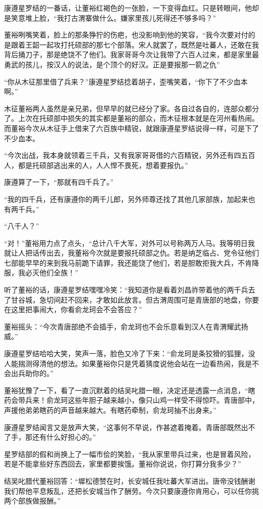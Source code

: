 康遵星罗结的一番话，让董裕红褐色的一张脸，一下变得血红。只是转眼间，他却是笑意堆上脸，“我打古渭寨做什么。嫌家里孩儿死得还不够多吗？”

董裕咧嘴笑着，脸上的那条狰狞的伤疤，也没影响到他的笑容，“我今次要对付的是跟着王韶一起攻打托硕部的那七个部落。宋人就罢了，既然是吐蕃人，还敢在我背后捅刀子，那是绝饶不了他们。我家哥哥今次让我带了六百人过来，都是家里最勇武的孩儿，按汉人的说法，是个顶个的好汉。正是要报那一箭之仇”

“你从木征那里借了兵来？”康遵星罗结捻着胡子，歪嘴笑着，“你下了不少血本啊。”

木征董裕两人虽然是亲兄弟，但早早的就已经分了家。各自过各自的，连部众都分了。上次在托硕部中损失的其实都是董裕的部众，而木征根本就是在河州看热闹。而董裕今次从木征手上借来了六百族中精锐，就跟康遵星罗结说得一样，可是下了不少血本。

“今次出战，我本身就领着三千兵，又有我家哥哥借的六百精锐，另外还有四五百人，都是托硕部逃出来的人，人人悍不畏死，想着要报仇。”

康遵算了一下，“那就有四千兵了。”

“我的四千兵，还有康遵你的两千儿郎，另外师尊还找了其他几家部族，加起来也有两千兵。”

“八千人？”

“对！”董裕用力点了点头，“总计八千大军，对外可以号称两万人马。我等明日我就让人把话传出去，我董裕今次就是要报托硕部之仇。若是纳芝临占、党令征他们七部能早早的来到我马前跪下请罪，我还能饶了他们，若是胆敢拒我大兵，不肯降服，我必灭他们全族！”

听了董裕的话，康遵星罗结嘿嘿冷笑：“我知道你是看着刘昌祚带着他的两千兵去了甘谷城，急切间赶不回来，才敢如此放言。但古渭周围可是青唐部的地盘，你要在这里把事闹大，你看俞龙珂会不会答应？”

董裕摇头：“今次青唐部绝不会插手，俞龙珂也不会乐意看到汉人在青渭耀武扬威。”

康遵星罗结哈哈大笑，笑声一落，脸色又冷了下来：“俞龙珂是条狡猾的狐狸，没人能揣测得清他的想法。如果董裕你只是凭着猜度说他会站在一边看热闹，我是不会出兵助你的。”

董裕犹豫了一下，看了一直沉默着的结吴叱腊一眼，决定还是透露一点消息，“瞎药会带兵来！俞龙珂这些年胆子越来越小，像只山鸡一样受不得惊吓。青唐部中，声援他弟弟瞎药的声音越来越大。有瞎药牵制，俞龙珂抽不出身来。”

康遵星罗结闻言又是放声大笑，“这事何不早说，作甚遮着掩着。青唐部既然出不了手，那还有什么好担心的。”

星罗结部的假和尚换上了一幅市侩的笑脸，“我从家里带兵过来，也是冒着风险，若是不能拿些好东西回去，家里都要挨饿。董裕你说说，你打算分我多少？”

结吴叱腊代董裕回答：“墀松德赞在时，长安城任我吐蕃大军进出。唐帝没钱酬谢我们帮他平息叛乱，还把长安城当作了酬劳。今次只要康遵你肯用心，可以任你挑两个部族做报酬。”

